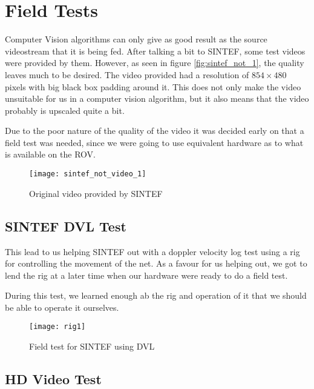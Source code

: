 
\chapter{Field Tests}\label{ch:field_test}

Computer Vision algorithms can only give as good result as the source videostream that it is 
being fed. After talking a bit to SINTEF, some test videos were provided by them. However, as seen in figure 
\vref{fig:sintef_not_1}, the quality leaves much to be desired. The video provided had a resolution 
of $854 \times 480$ pixels with big black box padding around it. This does not only make 
the video unsuitable for us in a computer vision algorithm, but it also means that the video 
probably is upscaled quite a bit.

Due to the poor nature of the quality of the video it was decided early on that 
a field test was needed, since we were going to use equivalent hardware as to what is available on the ROV. 

\begin{figure}[htbp]
	\centering
	\texttt{[image: sintef\_not\_video\_1]}
	\caption{Original video provided by SINTEF}
	\label{fig:sintef_not_1}
\end{figure}

\section{SINTEF DVL Test}
This lead to us helping SINTEF out with a doppler velocity log test using a rig for controlling 
the movement of the net. As a favour for us helping out, we 
got to lend the rig at a later time when our hardware were ready to do a field test. 

During this test, we learned enough ab the rig and operation of it that we should be able to operate 
it ourselves.

\begin{figure}[htbp]
	\centering
	\texttt{[image: rig1]}
	\caption{Field test for SINTEF using DVL}
	\label{fig:test_dvl}
\end{figure}

\section{HD Video Test}

